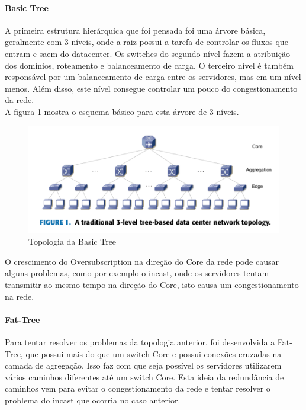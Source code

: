 \documentclass[12pt,a4paper]{report}
\begin{document}
\paragraph{Basic Tree}
A primeira estrutura hierárquica que foi pensada foi uma árvore básica, geralmente com 3 níveis, onde a raiz possui a tarefa de controlar os fluxos que entram e saem do datacenter. Os switches do segundo nível fazem a atribuição dos domínios, roteamento e balanceamento de carga. O terceiro nível é também responsável por um balanceamento de carga entre os servidores, mas em um nível menos. Além disso, este nível consegue controlar um pouco do congestionamento da rede.\\

A figura \ref{basic_tree} mostra o esquema básico para esta árvore de 3 níveis.\\

\begin{figure}[H]
\centering
\includegraphics[width=.8\textwidth]{imagens/basic_tree.png}
\caption{Topologia da Basic Tree}
\label{basic_tree}
\end{figure}

O crescimento do Oversubscription na direção do Core da rede pode causar alguns problemas, como por exemplo o incast, onde os servidores tentam transmitir ao mesmo tempo na direção do Core, isto causa um congestionamento na rede.\\

\paragraph{Fat-Tree}
Para tentar resolver os problemas da topologia anterior, foi desenvolvida a Fat-Tree, que possui mais do que um switch Core e possui conexões cruzadas na camada de agregação. Isso faz com que seja possível os servidores utilizarem vários caminhos diferentes até um switch Core. Esta ideia da redundância de caminhos vem para evitar o congestionamento da rede e tentar resolver o problema do incast que ocorria no caso anterior.\\
\end{document}
